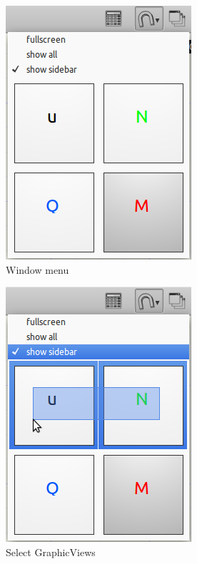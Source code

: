 \documentclass[a4paper,11pt]{report}
\begin{document}
\begin{minipage}[h]{7cm}
\begin{figure}[H]
\begin{center}
\includegraphics[scale=0.6]{../pictures/windowtoolbar.png}
\caption{Window menu}
\label{pic:windowtoolbar}
\end{center}
\end{figure}
\begin{figure}[H]
\begin{center}
\includegraphics[scale=0.6]{../pictures/windowtoolbar2.png}
\caption{Select GraphicViews}
\label{pic:windowtoolbar2}
\end{center}
\end{figure}
\end{minipage}
\end{document}

